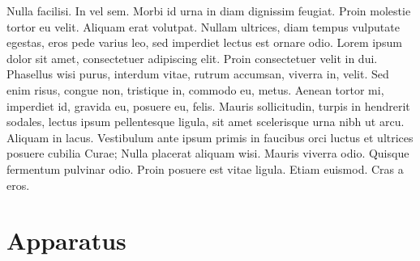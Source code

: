 \documentclass[a5paper]{article}
\begin{document}
Nulla facilisi. In vel sem. Morbi id urna in diam dignissim feugiat. Proin molestie tortor eu velit. Aliquam erat volutpat. Nullam ultrices, diam tempus vulputate egestas, eros pede varius leo, sed imperdiet lectus est ornare odio. Lorem ipsum dolor sit amet, consectetuer adipiscing elit. Proin consectetuer velit in dui. Phasellus wisi purus, interdum vitae, rutrum accumsan, viverra in, velit. Sed enim risus, congue non, tristique in, commodo eu, metus. Aenean tortor mi, imperdiet id, gravida eu, posuere eu, felis. Mauris sollicitudin, turpis in hendrerit sodales, lectus ipsum pellentesque ligula, sit amet scelerisque urna nibh ut arcu. Aliquam in lacus. Vestibulum ante ipsum primis in faucibus orci luctus et ultrices posuere cubilia Curae; Nulla placerat aliquam wisi. Mauris viverra odio. Quisque fermentum pulvinar odio. Proin posuere est vitae ligula. Etiam euismod. Cras a eros.
\pend
\endnumbering

\newpage
\section*{Apparatus}

\setlength\parindent{0em}
\end{document}
